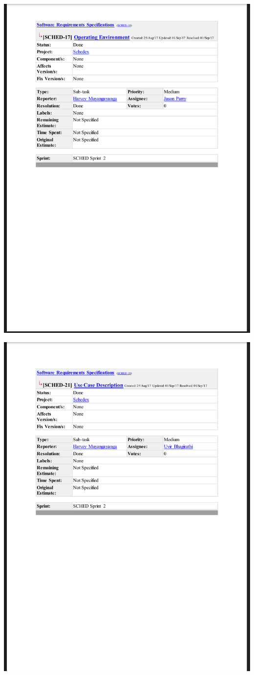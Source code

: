 \documentclass{article}
\begin{document}
\centerline{\includegraphics[scale=0.4]{sprint2_4}}

\centerline{\includegraphics[scale=0.4]{sprint2_5}}
\end{document}
